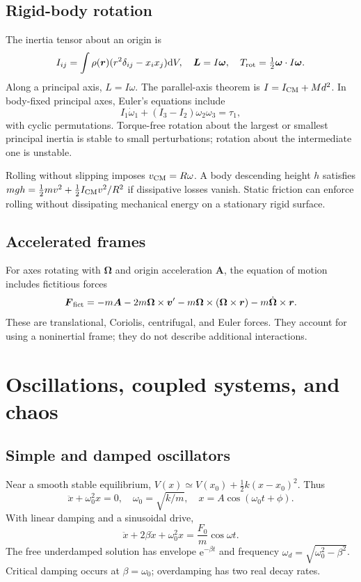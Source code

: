 \documentclass[11pt,oneside]{book}
\newcommand{\dd}{\mathrm{d}}
\newcommand{\ee}{\mathrm{e}}
\newcommand{\vect}[1]{\boldsymbol{#1}}
\theoremstyle{reviewstyle}
\begin{document}
\section{Rigid-body rotation}
The inertia tensor about an origin is
\begin{equation}
I_{ij}=\int\rho(\vect r)(r^2\delta_{ij}-x_ix_j)\dd V,
\quad \vect L=I\vect\omega,\quad T_{\rm rot}=\tfrac12\vect\omega\cdot I\vect\omega.
\end{equation}
Along a principal axis, $L=I\omega$. The parallel-axis theorem is $I=I_{\rm CM}+Md^2$. In body-fixed principal axes, Euler's equations include
\begin{equation}
I_1\dot\omega_1+(I_3-I_2)\omega_2\omega_3=\tau_1,
\end{equation}
with cyclic permutations. Torque-free rotation about the largest or smallest principal inertia is stable to small perturbations; rotation about the intermediate one is unstable.

Rolling without slipping imposes $v_{\rm CM}=R\omega$. A body descending height $h$ satisfies
$mgh=\tfrac12mv^2+\tfrac12I_{\rm CM}v^2/R^2$ if dissipative losses vanish. Static friction can enforce rolling without dissipating mechanical energy on a stationary rigid surface.
\section{Accelerated frames}
For axes rotating with $\vect\Omega$ and origin acceleration $\vect A$, the equation of motion includes fictitious forces
\begin{equation}
\vect F_{\rm fict}=-m\vect A-2m\vect\Omega\times\vect v'
-m\vect\Omega\times(\vect\Omega\times\vect r)
-m\dot{\vect\Omega}\times\vect r.
\end{equation}
These are translational, Coriolis, centrifugal, and Euler forces. They account for using a noninertial frame; they do not describe additional interactions.

\chapter{Oscillations, coupled systems, and chaos}
\section{Simple and damped oscillators}
Near a smooth stable equilibrium, $V(x)\simeq V(x_0)+\tfrac12k(x-x_0)^2$. Thus
\begin{equation}
\ddot x+\omega_0^2x=0,\quad \omega_0=\sqrt{k/m},\quad
x=A\cos(\omega_0t+\phi).
\end{equation}
With linear damping and a sinusoidal drive,
\begin{equation}
\ddot x+2\beta\dot x+\omega_0^2x=\frac{F_0}{m}\cos\omega t.
\end{equation}
The free underdamped solution has envelope $\ee^{-\beta t}$ and frequency $\omega_d=\sqrt{\omega_0^2-\beta^2}$. Critical damping occurs at $\beta=\omega_0$; overdamping has two real decay rates.
\end{document}
